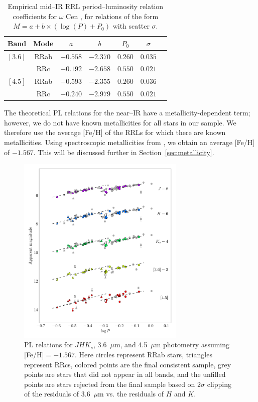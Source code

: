 \documentclass[a4paper,fleqn,usenatbib]{mnras}
\begin{document}
\begin{table}
\centering
\caption{Empirical mid--IR RRL period--luminosity relation coefficients for $\omega$ Cen \citep{2015arXiv150507858N}, for relations of the form $M = a + b \times (\log (P) + P_0)$ with scatter $\sigma$.} 
\label{tab:pl_table_m4}
\begin{tabular}{l||c|c|c|c|c|r} 
\hline \hline
Band & Mode & $a$ & $b$ & $P_0$ & $\sigma$ \\
\hline
$[3.6]$ & RRab & $-0.558$ & $-2.370$ & $0.260$ & $0.035$ \\
            & RRc & $-0.192$ & $-2.658$ & $0.550$ & $0.021$ \\
$[4.5]$ & RRab & $-0.593$ & $-2.355$ & $0.260$ & $0.036$ \\
            & RRc & $-0.240$ & $-2.979$ & $0.550$ & $0.021$ \\ 
            \hline
\end{tabular}
\end{table}


The theoretical PL relations for the near--IR have a metallicity-dependent term; however, we do not have known metallicities for all stars in our sample. We therefore use the average [Fe/H] of the RRLs for which there are known metallicities. Using spectroscopic metallicities from \citet{2006ApJ...640L..43S}, we obtain an average [Fe/H] of $-1.567$. This will be discussed further in Section~\ref{sec:metallicity}.

\begin{figure}
\begin{center}
\includegraphics[width=80mm]{reworked_fitting_code/final_plots/multiwavelength_PL_m4_clipped.pdf}
\caption{PL relations for $J\!H\!K_s$, 3.6~$\mu$m, and 4.5~$\mu$m photometry assuming [Fe/H]$=-1.567$. Here circles represent RRab stars, triangles represent RRcs, colored points are the final consistent sample, grey points are stars that did not appear in all bands, and the unfilled points are stars rejected from the final sample based on $2\sigma$ clipping of the residuals of 3.6~$\mu$m vs. the residuals of $H$ and $K$.}
\label{fig:omegaCen_pl_m4}
\end{center}
\end{figure}
\end{document}
